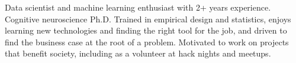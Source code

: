 
\begin{cvparagraph}

Data scientist and machine learning enthusiast with 2+ years experience. Cognitive neuroscience Ph.D. Trained in empirical design and statistics, enjoys learning new technologies and finding the right tool for the job, and driven to find the business case at the root of a problem. Motivated to work on projects that benefit society, including as a volunteer at hack nights and meetups.

\end{cvparagraph}
